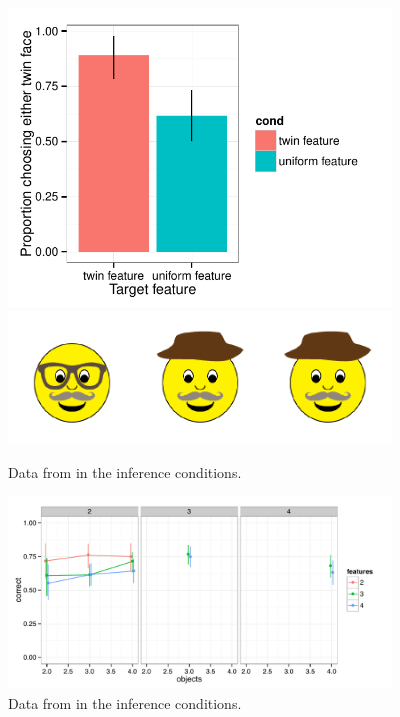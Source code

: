  \begin{figure}[t]
  \centering
  \includegraphics[width=4in]{../plots/3-levels-twins.pdf}
  \includegraphics[width=4in]{figures/levels-twins-stim.pdf}
  \caption{\label{fig:levels-levels} Data from  in the inference conditions.}
\end{figure}

 \begin{figure}[t]
  \centering
  \includegraphics[width=4in]{../plots/3-levels-size.pdf}
  \caption{\label{fig:levels-levels} Data from  in the inference conditions.}
\end{figure}
